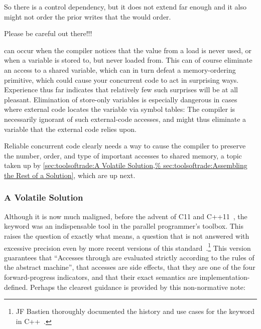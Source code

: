 \begin{description}[labelsep=.4em]
{	So there is a control dependency, but it does not extend far
	enough and it also might not order the prior writes that the
	 would order.

	Please be careful out there!!!
}\QuickQuizEnd

\item[Dead-code elimination] can occur when the compiler notices that
the value from a load is never used, or when a variable is stored to,
but never loaded from.
This can of course eliminate an access to a shared variable, which
can in turn defeat a memory-ordering primitive, which could cause your
concurrent code to act in surprising ways.
Experience thus far indicates that relatively few such surprises will
be at all pleasant.
Elimination of store-only variables is especially dangerous in cases
where external code locates the variable via symbol tables:
The compiler is necessarily ignorant of such external-code accesses,
and might thus eliminate a variable that the external code relies upon.

\end{description}

Reliable concurrent code clearly needs a way to cause the compiler to
preserve the number, order, and type of important accesses to shared
memory, a topic taken up by
\cref{sec:toolsoftrade:A Volatile Solution,%
sec:toolsoftrade:Assembling the Rest of a Solution},
which are up next.

\subsubsection{A Volatile Solution}
\label{sec:toolsoftrade:A Volatile Solution}

Although it is now much maligned, before the advent of C11 and
C++11~\cite{PeteBecker2011N3242}, the  keyword was an
indispensable tool in the parallel programmer's toolbox.
This raises the question of exactly what  means,
a question that is not answered with excessive precision even
by more recent versions of this standard~\cite{RichardSmith2019N4800}.\footnote{
	JF Bastien thoroughly documented the history and use cases
	for the  keyword in
	C++~\cite{JFBastien2018DeprecatingVolatile}.}
This version guarantees that ``Accesses through 
 are evaluated strictly according to the rules of the
abstract machine'',
that  accesses are side effects,
that they are one of the four forward-progress indicators,
and that their exact semantics are implementation-defined.
Perhaps the clearest guidance is provided by this non-normative note:

